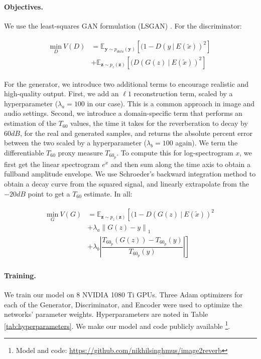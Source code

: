 \documentclass[10pt,twocolumn,letterpaper]{article}
\begin{document}
\paragraph{Objectives.}
We use the least-squares GAN formulation (LSGAN) \cite{mao2017least}. For the discriminator:

\begin{align}
\begin{split}
    \underset{D}{\text{min}}\ V(D) &  = \mathbb{E}_{\mathbf{y} \sim p_{data}(\mathbf{y})}[(1 - D(y\ |\ E(\tilde{x}))^2]\\
    & + \mathbb{E}_{\mathbf{z} \sim p_{z}(\mathbf{z})}[(D(G(z)\ |\ E(\tilde{x}))^2]
\end{split}
\end{align}

For the generator, we introduce two additional terms to encourage realistic and high-quality output. First, we add an $\ell 1$ reconstruction term, scaled by a hyperparameter ($\lambda_a = 100$ in our case). This is a common approach in image and audio settings. Second, we introduce a domain-specific term that performs an estimation of the $T_{60}$ values, the time it takes for the reverberation to decay by $60dB$, for the real and generated samples, and returns the absolute percent error between the two scaled by a hyperparameter ($\lambda_b=100$ again). We term the differentiable $T_{60}$ proxy measure $T_{60_p}$. To compute this for log-spectrogram $x$, we first get the linear spectrogram $e^x$ and then sum along the time axis to obtain a fullband amplitude envelope. We use Schroeder's backward integration method to obtain a decay curve from the squared signal, and linearly extrapolate from the $-20dB$ point to get a $T_{60}$ estimate. In all:

\begin{align}
\begin{split}
    \underset{G}{\text{min}}\ V(G) &= \mathbb{E}_{\mathbf{z} \sim p_{z}(\mathbf{z})} \left[ \right. (1 - D(G(z)\ |\ E(\tilde{x}))^2\\ 
     & + \lambda_a \left\lVert G(z) - y \right\rVert_1 \\
     & + \left. \lambda_b \left\lvert \dfrac{T_{60_p}(G(z)) - T_{60_p}(y)}{T_{60_p}(y)} \right\rvert \right] 
\end{split}
\end{align}

\paragraph{Training.}
We train our model on 8 NVIDIA 1080 Ti GPUs. Three Adam optimizers for each of the Generator, Discriminator, and Encoder were used to optimize the networks' parameter weights. Hyperparameters are noted in Table \ref{tab:hyperparameters}. We make our model and code publicly available \footnote{Model and code: \href{https://github.com/nikhilsinghmus/image2reverb}{https://github.com/nikhilsinghmus/image2reverb}}.
\end{document}
